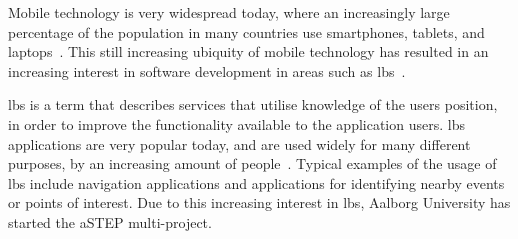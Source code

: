 Mobile technology is very widespread today, where an increasingly large percentage of the population in many countries use smartphones, tablets, and laptops~\cite{techcrunch_mobile_usage}. This still increasing ubiquity of mobile technology has resulted in an increasing interest in software development in areas such as \gls{lbs}~\cite{dey2010location}. 

\gls{lbs} is a term that describes services that utilise knowledge of the users position, in order to improve the functionality available to the application users. \gls{lbs} applications are very popular today, and are used widely for many different purposes, by an increasing amount of people~\cite[1-2]{schiller2004location}. Typical examples of the usage of \gls{lbs} include navigation applications and applications for identifying nearby events or points of interest. Due to this increasing interest in \gls{lbs}, Aalborg University has started the aSTEP multi-project. 


